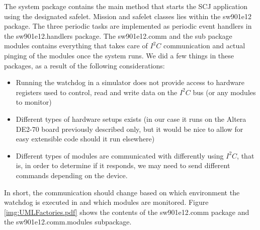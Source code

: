 The system package contains the main method that starts the SCJ application using the designated safelet. Mission and safelet classes lies within the sw901e12 package. The three periodic tasks are implemented as periodic event handlers in the sw901e12.handlers package.
The sw901e12.comm and the sub package modules contains everything that takes care of $\textit{I}^2\textit{C}$ communication and actual pinging of the modules once the system runs. We did a few things in these packages, as a result of the following considerations:
\begin{itemize}
    \item Running the watchdog in a simulator does not provide access to hardware registers used to control, read and write data on the $\textit{I}^2\textit{C}$ bus (or any modules to monitor)
    \item Different types of hardware setups exists (in our case it runs on the Altera DE2-70 board previously described only, but it would be nice to allow for easy extensible code should it run elsewhere)
    \item Different types of modules are communicated with differently using $\textit{I}^2\textit{C}$, that is, in order to determine if it responds, we may need to send different commands depending on the device.
\end{itemize}

In short, the communication should change based on which environment the watchdog is executed in and which modules are monitored. Figure \ref{img:UMLFactories.pdf} shows the contents of the sw901e12.comm package and the sw901e12.comm.modules subpackage.

